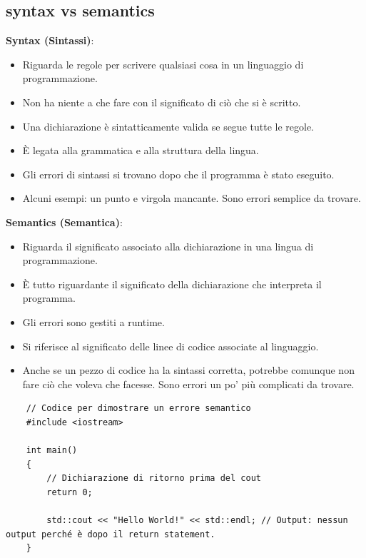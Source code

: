 \subsection{syntax vs semantics}

\textsf{\small \textbf{Syntax (Sintassi)}: } \\

\begin{itemize}
	\item \textsf{\small Riguarda le regole per scrivere qualsiasi cosa in un linguaggio di programmazione.}
	\item \textsf{\small Non ha niente a che fare con il significato di ciò che si è scritto.}
	\item \textsf{\small Una dichiarazione è sintatticamente valida se segue tutte le regole.}
	\item \textsf{\small È legata alla grammatica e alla struttura della lingua.}
	\item \textsf{\small Gli errori di sintassi si trovano dopo che il programma è stato eseguito.}
	\item \textsf{\small Alcuni esempi: un punto e virgola mancante. Sono errori semplice da trovare.}
\end{itemize}

\textsf{\small \textbf{Semantics (Semantica)}: } \\

\begin{itemize}
	\item \textsf{\small Riguarda il significato associato alla dichiarazione in una lingua di programmazione.}
	\item \textsf{\small È tutto riguardante il significato della dichiarazione che interpreta il programma.}
	\item \textsf{\small Gli errori sono gestiti a runtime.}
	\item \textsf{\small Si riferisce al significato delle linee di codice associate al linguaggio.}
	\item \textsf{\small Anche se un pezzo di codice ha la sintassi corretta, potrebbe comunque non fare ciò che voleva che facesse. Sono errori un po' più complicati da trovare.}
\end{itemize}

\begin{lstlisting}
	// Codice per dimostrare un errore semantico
	#include <iostream>
	
	int main()
	{
		// Dichiarazione di ritorno prima del cout
		return 0;
		
		std::cout << "Hello World!" << std::endl; // Output: nessun output perché è dopo il return statement.
	}
\end{lstlisting}

